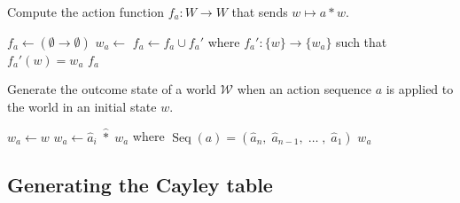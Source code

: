 \begin{algorithm}[H]
\begin{fullwidth}
\caption{
Compute the action function $f_{a}: W \to W$ that sends $w \mapsto a \ast w$.
}
\label{alg:ComputeActionFunction}
\hrulefill
\begin{algorithmic}[1]
    \State $f_{a} \gets (\emptyset \to \emptyset)$
    \State $w_{a} \gets$ 
    \State $f_{a} \gets f_{a} \cup f_{a}'$ where $f_{a}': \{w\} \to \{w_{a}\}$ such that $f_{a}'(w) = w_{a}$
    \EndFor
    \State \Return $f_{a}$
    \EndFunction
\end{algorithmic}
\end{fullwidth}
\end{algorithm}


\begin{algorithm}[H]
\begin{fullwidth}
\caption{
    Generate the outcome state of a world $\mathscr{W}$ when an action sequence $a$ is applied to the world in an initial state $w$.
}
\label{alg:GenerateActionOutcome}
\hrulefill
\begin{algorithmic}[1]
    \State $w_{a} \gets w$
    \State $w_{a} \gets \hat{a}_{i} \; \hat{\ast} \; w_{a}$ where $\operatorname{Seq}(a) = (\hat{a}_n, \; \hat{a}_{n-1}, \; \dots \;, \; \hat{a}_1)$
    \EndFor
    \State \Return $w_{a}$
    \EndFunction
\end{algorithmic}
\end{fullwidth}
\end{algorithm}


\subsection{Generating the Cayley table}

